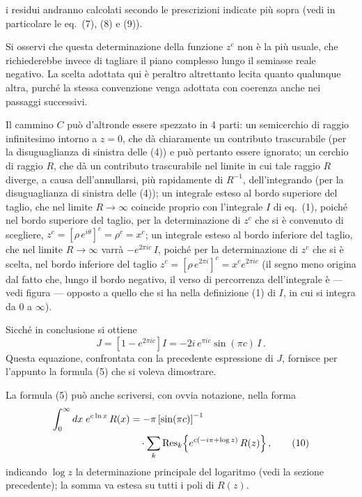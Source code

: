 \documentclass[11pt, a4paper]{book}
\numberwithin{equation}{section}
\begin{document}

i residui andranno calcolati secondo le prescrizioni indicate più sopra
(vedi in particolare le eq.~(7), (8) e (9)).

Si osservi che questa determinazione della funzione $z^c$ non è la più
usuale, che richiederebbe invece di tagliare il piano complesso lungo il
semiasse reale negativo. La scelta adottata qui è peraltro altrettanto lecita
quanto qualunque altra, purché la stessa convenzione venga adottata con
coerenza anche nei passaggi successivi.

Il cammino $C$ può d'altronde essere spezzato in 4 parti: un semicerchio
di raggio infinitesimo intorno a $z=0$, che dà chiaramente un contributo
trascurabile (per la disuguaglianza di sinistra delle (4)) e può pertanto essere
ignorato; un cerchio di raggio $R$, che dà un contributo trascurabile nel limite
in cui tale raggio $R$ diverge, a causa dell'annullarsi, più rapidamente di
$R^{-1}$, dell'integrando (per la disuguaglianza di sinistra delle (4)); un
integrale esteso al bordo superiore del taglio, che nel limite $R \to \infty$
coincide proprio con l'integrale $I$ di eq.~(1), poiché nel bordo superiore del
taglio, per la determinazione di $z^c$ che si è convenuto di scegliere,
$z^c = [\rho \, e^{i\theta}]^c = \rho^c = x^c$; un integrale esteso al bordo
inferiore del taglio, che nel limite $R \to \infty$ varrà $-e^{2\pi i c}\, I$,
poiché per la determinazione di $z^c$ che si è scelta, nel bordo inferiore del
taglio $z^c = [\rho\, e^{2\pi i}]^c = x^c e^{2\pi i c}$ (il segno meno origina
dal fatto che, lungo il bordo negativo, il verso di percorrenza dell'integrale è
--- vedi figura --- opposto a quello che si ha nella definizione (1) di $I$, in
cui si integra da $0$ a $\infty$).

Sicché in conclusione si ottiene
\[
    J = \left[1 - e^{2\pi i c}\right] I = -2i\, e^{\pi i c}\sin(\pi c)\, I \,.
\]
Questa equazione, confrontata con la precedente espressione di $J$, fornisce
per l'appunto la formula (5) che si voleva dimostrare.

\medskip
La formula (5) può anche scriversi, con ovvia notazione, nella forma
\begin{align}
    \int_0^\infty dx\; e^{c \ln x}\, R(x) &= -\pi\left[\sin(\pi c)\right]^{-1} \notag\\
    &\quad \cdot \sum_k \mathrm{Res}_k\!\left\{e^{c(-i\pi + \log z)}\, R(z)\right\}, \tag{10}
\end{align}
indicando $\log z$ la determinazione principale del logaritmo (vedi la sezione
precedente); la somma va estesa su tutti i poli di $R(z)$.
\end{document}

